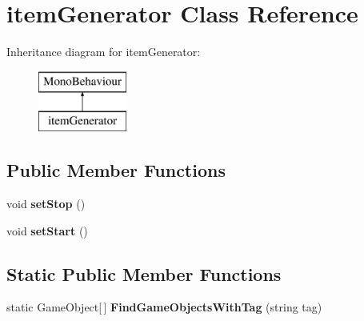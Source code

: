 \hypertarget{classitem_generator}{}\section{item\+Generator Class Reference}
\label{classitem_generator}
Inheritance diagram for item\+Generator\+:\begin{figure}[H]
\begin{center}
\leavevmode
\includegraphics[height=2.000000cm]{classitem_generator}
\end{center}
\end{figure}
\subsection*{Public Member Functions}
\begin{DoxyCompactItemize}
\item 
void {\bfseries set\+Stop} ()\hypertarget{classitem_generator_a3887a75f36ad1a63fa0b06b790260379}{}\label{classitem_generator_a3887a75f36ad1a63fa0b06b790260379}

\item 
void {\bfseries set\+Start} ()\hypertarget{classitem_generator_ac60c74b86f9e461cb80c705ce38d94d2}{}\label{classitem_generator_ac60c74b86f9e461cb80c705ce38d94d2}

\end{DoxyCompactItemize}
\subsection*{Static Public Member Functions}
\begin{DoxyCompactItemize}
\item 
static Game\+Object\mbox{[}$\,$\mbox{]} {\bfseries Find\+Game\+Objects\+With\+Tag} (string tag)\hypertarget{classitem_generator_a4d3ffcf511724da55ee037738938a3e9}{}\label{classitem_generator_a4d3ffcf511724da55ee037738938a3e9}

\end{DoxyCompactItemize}
